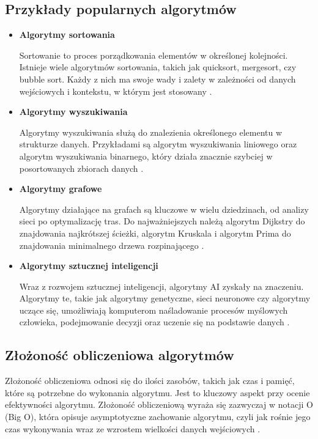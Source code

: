 \subsection{Przykłady popularnych algorytmów}
\begin{itemize}
    \item{\textbf{Algorytmy sortowania}}

    Sortowanie to proces porządkowania elementów w określonej kolejności. Istnieje wiele algorytmów sortowania, takich jak quicksort, mergesort, czy bubble sort. Każdy z nich ma swoje wady i zalety w zależności od danych wejściowych i kontekstu, w którym jest stosowany \cite{algorithms}.
    
    \item{\textbf{Algorytmy wyszukiwania}}

    Algorytmy wyszukiwania służą do znalezienia określonego elementu w strukturze danych. Przykładami są algorytm wyszukiwania liniowego oraz algorytm wyszukiwania binarnego, który działa znacznie szybciej w posortowanych zbiorach danych \cite{sedgewick}.
    
    \item{\textbf{Algorytmy grafowe}}

    Algorytmy działające na grafach są kluczowe w wielu dziedzinach, od analizy sieci po optymalizację tras. Do najważniejszych należą algorytm Dijkstry do znajdowania najkrótszej ścieżki, algorytm Kruskala i algorytm Prima do znajdowania minimalnego drzewa rozpinającego \cite{algorithms}.
    
    \item{\textbf{Algorytmy sztucznej inteligencji}}

    Wraz z rozwojem sztucznej inteligencji, algorytmy AI zyskały na znaczeniu. Algorytmy te, takie jak algorytmy genetyczne, sieci neuronowe czy algorytmy uczące się, umożliwiają komputerom naśladowanie procesów myślowych człowieka, podejmowanie decyzji oraz uczenie się na podstawie danych \cite{Mitchell1996AnIT}.
    
\end{itemize}

\subsection{Złożoność obliczeniowa algorytmów}

Złożoność obliczeniowa odnosi się do ilości zasobów, takich jak czas i pamięć, które są potrzebne do wykonania algorytmu. Jest to kluczowy aspekt przy ocenie efektywności algorytmu. Złożoność obliczeniową wyraża się zazwyczaj w notacji O (Big O), która opisuje asymptotyczne zachowanie algorytmu, czyli jak rośnie jego czas wykonywania wraz ze wzrostem wielkości danych wejściowych \cite{artoOfProgramming}.

